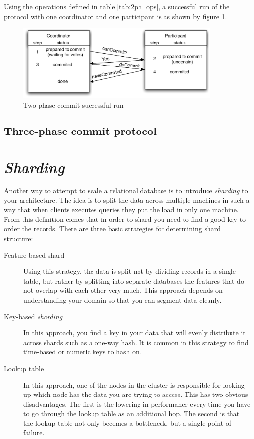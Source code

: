 Using the operations defined in table \ref{tab:2pc_ops}, a successful run of the protocol with one coordinator and one participant is as shown by figure \ref{fig:2pc_run}.

\begin{figure}[htb]
  \begin{center}
    \leavevmode
    \includegraphics[width=0.9\textwidth]{images/2pc}
  \end{center}
  \caption{Two-phase commit successful run\cite{coulouris2005distributed}}
  \label{fig:2pc_run}
\end{figure}

\subsection{Three-phase commit protocol}

\section{\emph{Sharding}}

Another way to attempt to scale a relational database is to introduce \emph{sharding} to your architecture. The idea is to split the data across multiple machines in such a way that when clients executes queries they put the load in only one machine. From this definition comes that in order to shard you need to find a good key to order the records. There are three basic strategies for determining shard structure:

\begin{description}
	\item[Feature-based shard]  Using this strategy, the data is split not by dividing records in a single table, but rather by splitting into separate databases the features that do not overlap with each other very much. This approach depends on understanding your domain so that you can segment data cleanly.
	\item[Key-based \emph{sharding}] In this approach, you find a key in your data that will evenly distribute it across shards such as a one-way hash. It is common in this strategy to find time-based or numeric keys to hash on.
	\item[Lookup table] In this approach, one of the nodes in the cluster is responsible for looking up which node has the data you are trying to access. This has two obvious disadvantages. The first is the lowering in performance every time you have to go through the lookup table as an additional hop. The second is that the lookup table not only becomes a bottleneck, but a single point of failure.
\end{description}

